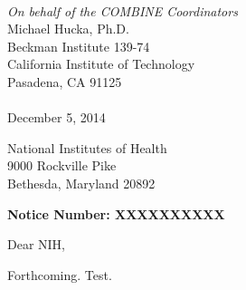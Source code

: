 \documentclass[11pt,letterpaper]{article}
\begin{document}
\thispagestyle{empty}

\vspace*{-4.5em}
\begin{center}
  \textsc{\Large{}}\\
  {\tiny{}}
\end{center}

\vspace*{2em}%

\hspace{4in}%
\hspace*{-\parindent}%
\begin{flushright}
\begin{minipage}{4in}
\emph{On behalf of the COMBINE Coordinators}\\[2pt]
Michael Hucka, Ph.D.\\
Beckman Institute 139-74\\
California Institute of Technology\\
Pasadena, CA 91125\\
\\
December 5, 2014
\end{minipage}
\end{flushright}

\vspace*{2ex}

\begin{flushleft}
National Institutes of Health\\
9000 Rockville Pike\\
Bethesda, Maryland 20892
\end{flushleft}

\setlength{\parskip}{0.7em}

\begin{flushleft}
\textbf{Notice Number: XXXXXXXXXX}

Dear NIH,

Forthcoming. Test.

\end{flushleft}
\clearpage



\end{document}
